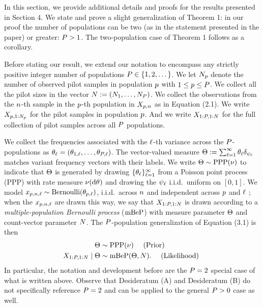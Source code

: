 
In this section, we provide additional details and proofs for the results presented in Section 4.
We state and prove a slight generalization of Theorem 1: in our proof the number of populations can be two (as in the statement presented in the paper) or greater: $P > 1$. 
The two-population case of Theorem 1 follows as a corollary.

Before stating our result, we extend our notation to encompass any strictly positive integer number of populations $P \in \{1,2,\dots\}$.
We let $N_{p}$ denote the number of observed pilot samples in population $p$ with $1 \le p \le P$.
We collect all the pilot sizes in the vector $\vecsamplesize := (\samplesize{1}, \ldots,\samplesize{\numpops})$.
We collect the observations from the $n$-th sample in the $p$-th population in $X_{p,n}$ as in Equation (2.1).
We write $X_{p,1:N_{p}}$ for the pilot samples in population $p$.
And we write $X_{1:\numpops, \bm{1}:\vecsamplesize}$ for the full collection of pilot samples across all $P$ populations.

We collect the frequencies associated with the $\ell$-th variance across the $P$-populations as $\genericvecvariantfreq = (\variantfreq{1}{\variantidx}, \ldots, \variantfreq{\numpops}{\variantidx})$.
The vector-valued measure $\randommeas :=  \sum_{\variantidx=1}^{\infty} \genericvecvariantfreq \dirac{\genericvariantlabel}$ matches variant frequency
vectors with their labels. We write $\Theta \sim \mathrm{PPP}(\nu)$ to indicate that $\Theta$
is generated by drawing $\{\genericvecvariantfreq\}_{\variantidx=1}^{\infty}$ from a Poisson
point process (PPP) with rate measure $\levync(\de\vecvariantfreq{})$ and drawing the $\psi_{\ell}$
i.i.d.\ uniform on $[0,1]$. We model $x_{p,n,\ell} \sim \textrm{Bernoulli}(\theta_{p, \ell})$, i.i.d.\ across $n$
and independent across $p$ and $\ell$ ; when the $x_{p,n,\ell}$ are drawn this way, we say that
$X_{1:\numpops, \bm{1}:\vecsamplesize}$
is drawn according to a \emph{multiple-population Bernoulli process} ($\mathrm{mBeP}$) with measure parameter $\Theta$ and count-vector parameter $\vecsamplesize$.
The $P$-population generalization of Equation (3.1) is then
\begin{align}
	\begin{split}
		\randommeas & \sim \PPP(\nu) \quad \textrm{ (Prior) } \\
		X_{1:\numpops, \bm{1}:\vecsamplesize} \mid \randommeas & \sim \mBeP(\randommeas, \vecsamplesize). \quad \textrm{ (Likelihood) }
		\label{eq:appx_generative_model}
	\end{split}
\end{align}
In particular, the notation and development before are the $P=2$ special case of what is written above.
Observe that Desideratum (A) and Desideratum (B) do not specifically reference $P=2$ and can be
applied to the general $P > 0$ case as well.


